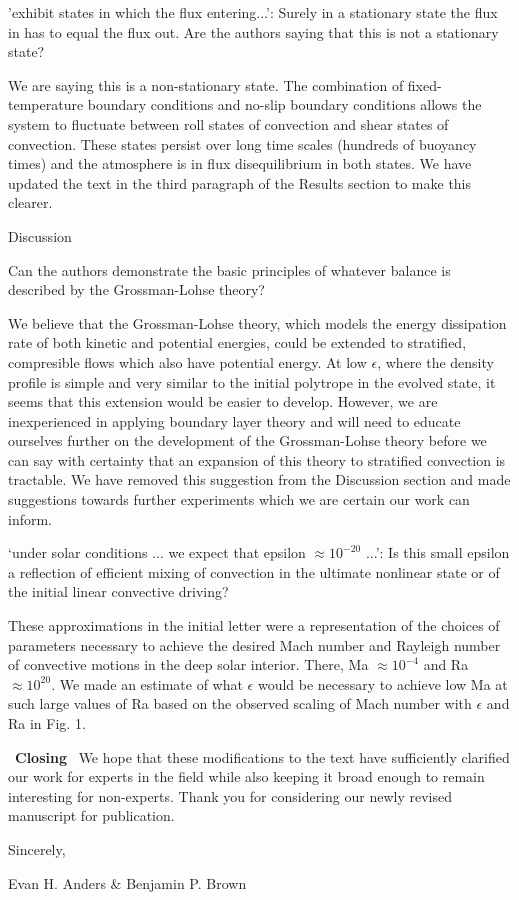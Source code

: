\documentclass[aps, 11pt, singlecolumn]{revtex4-1} %
\begin{document}
\begin{singlespace}
\begin{myquotation}
'exhibit states in which the flux entering...': Surely in a
stationary state the flux in has to equal the flux out. Are the
authors saying that this is not a stationary state?
\end{myquotation}
We are saying this is a non-stationary state.  The combination of fixed-temperature
boundary conditions and no-slip boundary conditions allows the system to fluctuate between
roll states of convection and shear states of convection.  These states persist over long
time scales (hundreds of buoyancy times) and the atmosphere is in flux disequilibrium in both states.
We have updated the text in the third paragraph of the Results section to make this clearer.

\begin{myquotation}
Discussion

Can the authors demonstrate the basic principles of whatever balance
is described by the Grossman-Lohse theory?
\end{myquotation}
We believe that the Grossman-Lohse theory, which models the energy dissipation rate of both
kinetic and potential energies, could be extended to stratified, compresible flows which also
have potential energy.  At low $\epsilon$, where the density profile is simple and very similar
to the initial polytrope in the evolved state, it seems that this extension would be easier to
develop.  However, we are inexperienced in applying boundary layer theory and 
will need to educate ourselves
further on the development of the Grossman-Lohse theory before we can say
with certainty that an expansion of this theory to stratified convection is tractable. 
We have removed this suggestion from
the Discussion section and made suggestions towards further experiments which we are certain our
work can inform.


\begin{myquotation}
`under solar conditions ... we expect that epsilon  $\approx 10^{-20}$
...': Is this small epsilon a reflection of efficient mixing of
convection in the ultimate nonlinear state or of the initial linear
convective driving?
\end{myquotation}
These approximations in the initial letter were a representation of the choices of
parameters necessary to achieve the desired Mach number and Rayleigh number of convective
motions in the deep solar interior.  There, Ma $\approx 10^{-4}$ and Ra $\approx 10^{20}$.
We made an estimate of what $\epsilon$ would be necessary to achieve low Ma at such large
values of Ra based on the observed scaling of Mach number with $\epsilon$ and Ra
in Fig. 1.

$\,$
\newline
\noindent
\textbf{Closing}
\newline
$\,$\newline
We hope that these modifications to the text have sufficiently clarified our work for experts
in the field while also keeping it broad enough to remain interesting for non-experts.
Thank you for considering our newly revised manuscript for publication.

\end{singlespace}


\noindent
Sincerely,

Evan H. Anders \& Benjamin P. Brown




\end{document}
